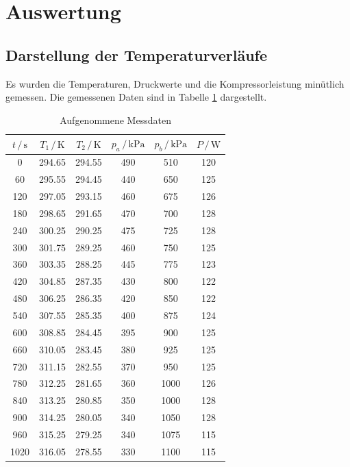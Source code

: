 \section{Auswertung}
\label{sec:Auswertung}

\subsection{Darstellung der Temperaturverläufe}

Es wurden die Temperaturen, Druckwerte und die Kompressorleistung minütlich 
gemessen. Die gemessenen Daten sind in Tabelle \ref{tab:Messdaten} dargestellt. 

\begin{table}
\centering
\caption{Aufgenommene Messdaten}
\label{tab:Messdaten}
\begin{tabular}{c c c c c c}
\toprule
$t \,/\, \si{\second}$ & $T_1 \,/\, \si{\kelvin}$ & 
$T_2 \,/\, \si{\kelvin}$ & $p_a \,/\, \si{\kilo\pascal}$ & 
$p_b \,/\, \si{\kilo\pascal}$& $P \,/\, \si{\watt}$\\
\midrule
   0 & 294.65 & 294.55 & 490 &  510 & 120\\
  60 & 295.55 & 294.45 & 440 &  650 & 125\\
 120 & 297.05 & 293.15 & 460 &  675 & 126\\
 180 & 298.65 & 291.65 & 470 &  700 & 128\\
 240 & 300.25 & 290.25 & 475 &  725 & 128\\
 300 & 301.75 & 289.25 & 460 &  750 & 125\\
 360 & 303.35 & 288.25 & 445 &  775 & 123\\
 420 & 304.85 & 287.35 & 430 &  800 & 122\\
 480 & 306.25 & 286.35 & 420 &  850 & 122\\
 540 & 307.55 & 285.35 & 400 &  875 & 124\\
 600 & 308.85 & 284.45 & 395 &  900 & 125\\
 660 & 310.05 & 283.45 & 380 &  925 & 125\\
 720 & 311.15 & 282.55 & 370 &  950 & 125\\
 780 & 312.25 & 281.65 & 360 & 1000 & 126\\
 840 & 313.25 & 280.85 & 350 & 1000 & 128\\
 900 & 314.25 & 280.05 & 340 & 1050 & 128\\
 960 & 315.25 & 279.25 & 340 & 1075 & 115\\
1020 & 316.05 & 278.55 & 330 & 1100 & 115\\

\end{tabular}
\end{table}
